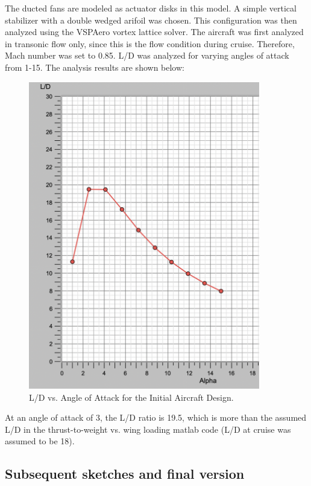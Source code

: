 \documentclass{article}
\begin{document}
The ducted fans are modeled as actuator disks in this model. A simple vertical stabilizer with a double wedged arifoil was chosen. This configuration was then analyzed using the VSPAero vortex lattice solver. The aircraft was first analyzed in transonic flow only, since this is the flow condition during cruise. Therefore, Mach number was set to 0.85. L/D was analyzed for varying angles of attack from 1-15. The analysis results are shown below: 

\begin{figure}[H]
    \centering
    \includegraphics[width=0.90\textwidth]{Figures/VSP_Initial.png}
    \caption[L/D vs. Angle of Attack for the Initial Aircraft Design]{L/D vs. Angle of Attack for the Initial Aircraft Design. \label{fig:LDInitial} }
\end{figure} 
    
At an angle of attack of 3, the L/D ratio is 19.5, which is more than the assumed L/D in the thrust-to-weight vs. wing loading matlab code (L/D at cruise was assumed to be 18). 

\subsection{Subsequent sketches and final version}
\end{document}
